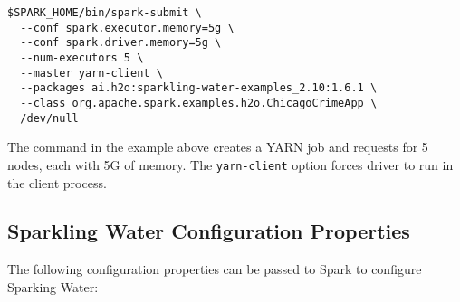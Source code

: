 \begin{lstlisting}[style=Bash]
$SPARK_HOME/bin/spark-submit \ 
  --conf spark.executor.memory=5g \
  --conf spark.driver.memory=5g \
  --num-executors 5 \
  --master yarn-client \
  --packages ai.h2o:sparkling-water-examples_2.10:1.6.1 \
  --class org.apache.spark.examples.h2o.ChicagoCrimeApp \
  /dev/null
\end{lstlisting}

The command in the example above creates a YARN job and requests for 5 nodes, each with 5G of memory. The \texttt{yarn-client} option forces driver to run in the client process.

\subsection{Sparkling Water Configuration Properties}

The following configuration properties can be passed to Spark to configure Sparking Water:

